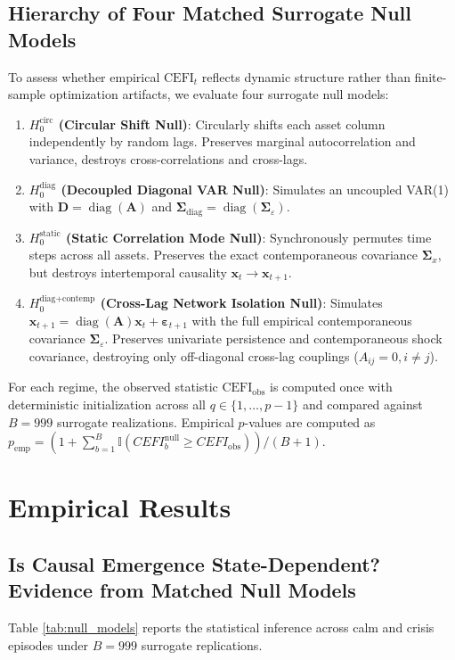 \documentclass[review,12pt,authoryear]{elsarticle}
\begin{document}
\subsection{Hierarchy of Four Matched Surrogate Null Models}
To assess whether empirical $\mathrm{CEFI}_t$ reflects dynamic structure rather than finite-sample optimization artifacts, we evaluate four surrogate null models:
\begin{enumerate}
    \item \textbf{$H_0^{\text{circ}}$ (Circular Shift Null)}: Circularly shifts each asset column independently by random lags. Preserves marginal autocorrelation and variance, destroys cross-correlations and cross-lags.
    \item \textbf{$H_0^{\text{diag}}$ (Decoupled Diagonal VAR Null)}: Simulates an uncoupled VAR(1) with $\mathbf{D} = \operatorname{diag}(\mathbf{A})$ and $\boldsymbol{\Sigma}_{\text{diag}} = \operatorname{diag}(\boldsymbol{\Sigma}_\varepsilon)$.
    \item \textbf{$H_0^{\text{static}}$ (Static Correlation Mode Null)}: Synchronously permutes time steps across all assets. Preserves the exact contemporaneous covariance $\boldsymbol{\Sigma}_x$, but destroys intertemporal causality $\mathbf{x}_t \to \mathbf{x}_{t+1}$.
    \item \textbf{$H_0^{\text{diag+contemp}}$ (Cross-Lag Network Isolation Null)}: Simulates $\mathbf{x}_{t+1} = \operatorname{diag}(\mathbf{A})\mathbf{x}_t + \boldsymbol{\varepsilon}_{t+1}$ with the full empirical contemporaneous covariance $\boldsymbol{\Sigma}_\varepsilon$. Preserves univariate persistence and contemporaneous shock covariance, destroying only off-diagonal cross-lag couplings ($A_{ij} = 0, i \neq j$).
\end{enumerate}
For each regime, the observed statistic $\mathrm{CEFI}_{\text{obs}}$ is computed once with deterministic initialization across all $q \in \{1, \dots, p-1\}$ and compared against $B=999$ surrogate realizations. Empirical $p$-values are computed as $p_{\text{emp}} = (1 + \sum_{b=1}^B \mathbb{I}(CEFI_b^{\text{null}} \ge CEFI_{\text{obs}}))/(B + 1)$.

\section{Empirical Results}
\label{sec:results}

\subsection{Is Causal Emergence State-Dependent? Evidence from Matched Null Models}
Table \ref{tab:null_models} reports the statistical inference across calm and crisis episodes under $B=999$ surrogate replications.
\end{document}
